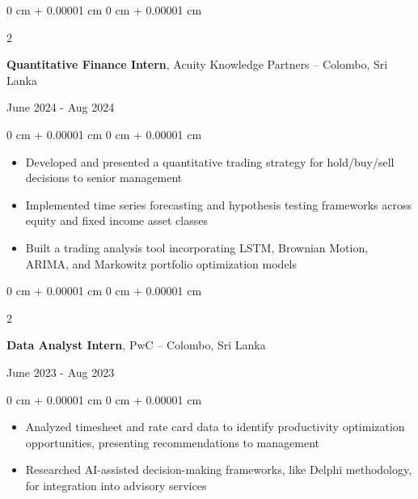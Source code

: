 \documentclass[10 pt,letterpaper]{article}
\newenvironment{highlights}{
    \begin{itemize}[
        topsep=0.10 cm,
        parsep=0.10 cm,
        partopsep=0pt,
        itemsep=0pt,
        leftmargin=0 cm + 10pt
    ]
}{
    \end{itemize}
} %
\newenvironment{onecolentry}{
    \begin{adjustwidth}{
        0 cm + 0.00001 cm
    }{
        0 cm + 0.00001 cm
    }
}{
    \end{adjustwidth}
} %
\newenvironment{twocolentry}[2][]{
    \onecolentry
    \def\secondColumn{#2}
    \setcolumnwidth{\fill, 4.5 cm}
    \begin{paracol}{2}
}{
    \switchcolumn \raggedleft \secondColumn
    \end{paracol}
    \endonecolentry
} %
\begin{document}
        \vspace{0.1 cm}
        
        \begin{twocolentry}{
            June 2024 - Aug 2024
        }
            \textbf{Quantitative Finance Intern}, Acuity Knowledge Partners -- Colombo, Sri Lanka
        \end{twocolentry}

        \vspace{0.1 cm}
        \begin{onecolentry}
            \begin{highlights}
                \item Developed and presented a quantitative trading strategy for hold/buy/sell decisions to senior management
                \item Implemented time series forecasting and hypothesis testing frameworks across equity and fixed income asset classes
                \item Built a trading analysis tool incorporating LSTM, Brownian Motion, ARIMA, and Markowitz portfolio optimization models
            \end{highlights}
        \end{onecolentry}


        \vspace{0.1 cm}

        \begin{twocolentry}{
            June 2023 - Aug 2023
        }
            \textbf{Data Analyst Intern}, PwC -- Colombo, Sri Lanka
        \end{twocolentry}

        \vspace{0.1 cm}
        \begin{onecolentry}
            \begin{highlights}
                \item Analyzed timesheet and rate card data to identify productivity optimization opportunities, presenting recommendations to management
                \item Researched AI-assisted decision-making frameworks, like Delphi methodology, for integration into advisory services
            \end{highlights}
        \end{onecolentry}
\end{document}
